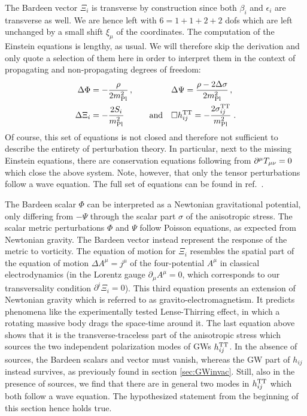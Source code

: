 The Bardeen vector $\Xi_i$ is transverse by construction since both $\beta_i$ and $\epsilon_i$ are transverse as well. We are hence left with $6 = 1 + 1 + 2 + 2$ \acp{dof} which are left  unchanged by a small shift $\xi_\mu$ of the coordinates. The computation of the Einstein equations is lengthy, as usual. We will therefore skip the derivation and only quote a selection of them here in order to interpret them in the context of propagating and non-propagating degrees of freedom:
\begin{subequations}
	\begin{align}
		\Delta \Phi &= - \frac{\rho}{2 m_\text{Pl}^2} \, , && \Delta \Psi = \frac{\rho - 2 \Delta \sigma}{2 m_\text{Pl}^2} \, , \\ \Delta \Xi_i &= - \frac{2 S_i}{m_\text{Pl}^2}  \qquad \quad \text{and}&&		\square h_{ij}^{\text{TT}} = - \frac{2 \sigma_{ij}^{\text{TT}}}{m_\text{Pl}^2} \; \label{eq:SVTeom} .
	\end{align}
\end{subequations}
Of course, this set of equations is not closed and therefore not sufficient to describe the entirety of perturbation theory. In particular, next to the missing Einstein equations, there are conservation equations following from $\partial^\mu T_{{\mu \nu}} = 0$ which close the above system. Note, however, that only the tensor perturbations follow a wave equation. The full set of equations can be found in ref.~\cite{Maggiore:2018sht}.

The Bardeen scalar $\Phi$ can be interpreted as a Newtonian gravitational potential, only differing from $-\Psi$ through the scalar part $\sigma$ of the anisotropic stress. The scalar  metric perturbations $\Phi$ and $\Psi$ follow Poisson equations, as expected from Newtonian gravity. The Bardeen vector instead represent the response of the metric to vorticity. The equation of motion for $\Xi_i$ resembles the spatial part of the equation of motion $\Delta A^\mu = j^\mu$ of the four-potential $A^\mu$ in classical electrodynamics (in the Lorentz gauge $\partial_\mu A^\mu = 0$, which corresponds to our transversality condition $\partial^i \Xi_i = 0$). This third equation presents an extension of Newtonian gravity which is referred to as gravito-electromagnetism. It predicts phenomena like the experimentally tested Lense-Thirring effect, in which a rotating massive body drags the space-time around it. The last equation above shows that it is the transverse-traceless part of the anisotropic stress which sources the two independent polarization modes of \acp{GW} $h_{ij}^{\text{TT}}$. In the absence of sources, the Bardeen scalars and vector must vanish, whereas the \ac{GW} part of $h_{ij}$ instead survives, as previously found in section \ref{sec:GWinvac}. Still, also in the presence of sources, we find that there are in general two modes in $h_{ij}^{\text{TT}}$ which both follow a wave equation. The hypothesized statement from the beginning of this section hence holds true.

